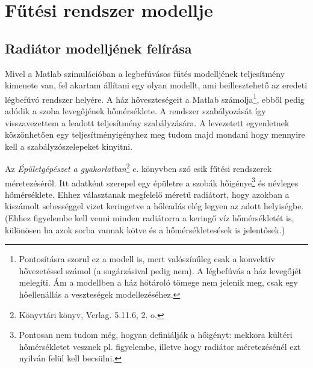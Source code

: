 \section{Fűtési rendszer modellje}


\subsection{Radiátor modelljének felírása}

Mivel a Matlab szimulációban a legbefúvásos fűtés modelljének teljesítmény kimenete van, fel akartam állítani egy olyan modellt, ami beillesztehető az eredeti légbefúvó rendszer helyére. A ház hőveszteségeit a Matlab számolja\footnote{Pontosításra szorul ez a modell is, mert valószínűleg csak a konvektív hővezetéssel számol (a sugárzásival pedig nem). A légbefúvás a ház levegőjét melegíti. Ám a modellben a ház hőtároló tömege nem jelenik meg, csak egy hőellenállás a veszteségek modellezéséhez.}, ebből pedig adódik a szoba levegőjének hőmérséklete. A rendszer szabályozását így visszavezettem a leadott teljesítmény szabályzására. A levezetett egyenletnek köszönhetően egy teljesítményigényhez meg tudom majd mondani hogy mennyire kell a szabályzószelepeket kinyitni.


Az \textit{Épületgépészet a gyakorlatban}\footnote{Könyvtári könyv, Verlag. 5.11.6, 2. o.} c. könyvben szó esik fűtési rendszerek méretezéséről. Itt adatként szerepel egy épületre a szobák hőigénye\footnote{Pontosan nem tudom még, hogyan definiálják a hőigényt: mekkora kültéri hőmérsékletet vesznek pl. figyelembe, illetve hogy radiátor méretezésénél ezt nyilván felül kell becsülni.} és névleges hőmérséklete. Ehhez választanak megfelelő méretű radiátort, hogy azokban a kiszámolt sebességgel vizet keringetve a hőleadás elég legyen az adott helyiségbe.
{\scriptsize(Ehhez figyelembe kell venni minden radiátorra a keringő víz hőmérsékletét is, különösen ha azok sorba vannak kötve és a hőmérsékletesések is jelentősek.)}


